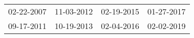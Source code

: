 \begin{supertabular}{llll}
 02-22-2007 &  11-03-2012 &  02-19-2015 &  01-27-2017 \\
 09-17-2011 &  10-19-2013 &  02-04-2016 &  02-02-2019 \\
\end{supertabular}
